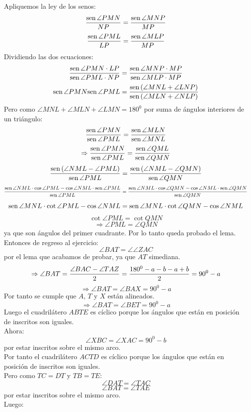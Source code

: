 \documentclass{book}
\newcommand{\sen}{\mathop{\rm sen}\nolimits} %
\begin{document}
\begin{enumerate}
          Apliquemos la ley de los senos:
          $${\sen {\angle PMN}\over NP}={\sen {\angle MNP}\over MP}$$
          $${\sen {\angle PML}\over LP}={\sen {\angle MLP}\over MP}$$
          Dividiendo las dos ecuaciones:
          $$\frac{\sen {\angle PMN}\cdot LP}{\sen {\angle PML}\cdot NP}=\frac{\sen {\angle MNP}\cdot MP}{\sen {\angle MLP}\cdot MP}$$
          $${\sen {\angle PMN}}{\sen {\angle PML}}=\frac{\sen {(\angle MNL+\angle LNP)}}{\sen {(\angle MLN+\angle NLP)}}$$
          Pero como $\angle MNL+\angle MLN+\angle LMN=180^0$ por suma de ángulos interiores de un triángulo:
          $$\frac{\sen {\angle PMN}}{\sen {\angle PML}}=\frac{\sen {\angle MLN}}{\sen {\angle MNL}}$$
          $$\Rightarrow\frac{\sen {\angle PMN}}{\sen {\angle PML}}=\frac{\sen {\angle QML}}{\sen {\angle QMN}}$$
          $$\frac{\sen {(\angle NML-\angle PML)}}{\sen {\angle PML}}=\frac{\sen {(\angle NML-\angle QMN)}}{\sen {\angle QMN}}$$
          $$\frac{\sen{\angle NML}\cdot\cos{\angle PML}-\cos{\angle NML}\cdot\sen{\angle PML}}{\sen{\angle PML}}=\frac{\sen{\angle NML}\cdot\cos{\angle QMN}-\cos{\angle NML}\cdot\sen{\angle QMN}}{\sen{\angle QMN}}$$
          $$\sen{\angle MNL}\cdot\cot{\angle PML}-\cos{\angle NML}=\sen{\angle MNL}\cdot\cot{\angle QMN}-\cos{\angle NML}$$
          $$\cot{\angle PML}=\cot{QMN}$$
          $$\Rightarrow\angle PML=\angle QMN$$
          ya que son ángulos del primer cuadrante. Por lo tanto queda probado el lema.\\
          Entonces de regreso al ejercicio:
          $$\angle BAT=\angle\angle ZAC$$
          por el lema que acabamos de probar, ya que $AT$ simediana.
          $$\Rightarrow\angle BAT={\angle BAC-\angle TAZ\over 2}={180^0-a-b-a+b\over 2}=90^0-a$$
          $$\Rightarrow\angle BAT=\angle BAX=90^0-a$$
          Por tanto se cumple que $A$, $T$ y $X$ están alineados.
          $$\Rightarrow\angle BAT=\angle BET=90^0-a$$
          Luego el cuadrilátero $ABTE$ es cíclico porque los ángulos que están en posición de inscritos son iguales.\\
          Ahora:
          $$\angle XBC=\angle XAC=90^0-b$$
          por estar inscritos sobre el mismo arco.\\
          Por tanto el cuadrilátero $ACTD$ es cíclico porque los ángulos que están en posición de inscritos son iguales. \\
          Pero como $TC=DT$ y $TB=TE$:
          $$\angle DAT=\angle TAC$$
          $$\angle BAT=\angle TAE$$
          por estar inscritos sobre el mismo arco.\\
          Luego:

\end{enumerate}
\end{document}
